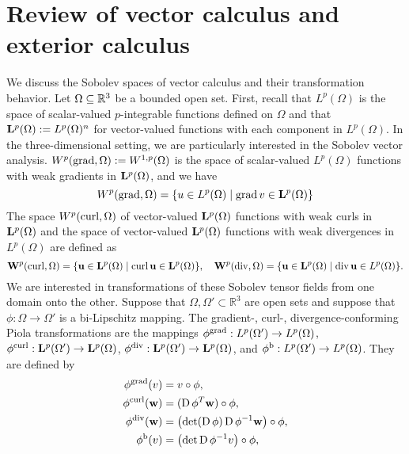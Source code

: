 \documentclass[a4paper]{article}
\begin{document}
\newpage 








\section{Review of vector calculus and exterior calculus}\label{section:calculus}

We discuss the Sobolev spaces of vector calculus and their transformation behavior. 
Let $\Omega \subseteq {\mathbb R}^{3}$ be a bounded open set. 
First, recall that $L^{p}(\Omega)$ is the space of scalar-valued $p$-integrable functions defined on $\Omega$
and that ${\mathbf L}^{p}(\Omega) := L^{p}(\Omega)^{n}$ for vector-valued functions with each component in $L^{p}(\Omega)$. 
In the three-dimensional setting, we are particularly interested in the Sobolev vector analysis. 
$W^p(\operatorname{grad},\Omega) := W^{1,p}(\Omega)$ is the space of scalar-valued $L^{p}(\Omega)$ functions with weak gradients in ${\mathbf L}^{p}(\Omega)$, and we have 
\[
    W^p(\grad,\Omega) = \{ u \in L^{p}(\Omega) \suchthat \grad v \in \bfL^{p}(\Omega) \}
\]
The space $W^{p}(\operatorname{curl},\Omega)$ of vector-valued ${\mathbf L}^{p}(\Omega)$ functions with weak curls in ${\mathbf L}^{p}(\Omega)$
and the space of vector-valued ${\mathbf L}^{p}(\Omega)$ functions with weak divergences in $L^{p}(\Omega)$ are defined as 
\[
    \bfW^{p}(\curl,\Omega) = \{ \bfu \in \bfL^{p}(\Omega) \suchthat \curl \bfu \in \bfL^{p}(\Omega) \},
    \quad 
    \bfW^{p}(\divergence,\Omega) = \{ \bfu \in \bfL^{p}(\Omega) \suchthat \divergence \bfu \in L^{p}(\Omega) \}.
\]
We are interested in transformations of these Sobolev tensor fields from one domain onto the other. 
Suppose that $\Omega, \Omega' \subset \mathbb{R}^3$ are open sets and suppose that $\phi: \Omega \to \Omega'$ is a bi-Lipschitz mapping.
The gradient-, curl-, divergence-conforming Piola transformations are the mappings 
$\phi^{\operatorname{grad}}: L^{p}(\Omega') \to L^{p}(\Omega)$,
$\phi^{\operatorname{curl}}: {\mathbf L}^{p}(\Omega') \to {\mathbf L}^{p}(\Omega)$, 
$\phi^{\operatorname{div}}: {\mathbf L}^{p}(\Omega') \to {\mathbf L}^{p}(\Omega)$,
and
$\phi^{\rm b}: L^{p}(\Omega') \to L^{p}(\Omega)$. 
They are defined by 
\begin{subequations}\label{eq_definition_piola}
\begin{align}
    \phi^{\operatorname{grad}}(v) &= v \circ \phi, \\
    \phi^{\operatorname{curl}}({\mathbf w}) &= (\operatorname{D}\phi^{T} {\mathbf w}) \circ \phi, \\
    \phi^{\operatorname{div}}({\mathbf w}) &= \left( \det(\operatorname{D}\phi) \operatorname{D}\phi^{-1} {\mathbf w} \right)  \circ \phi, \\
    \phi^{\rm b}(v) &= \left( \det\operatorname{D}\phi^{-1} v \right)  \circ \phi,
\end{align}
\end{subequations}
\end{document}
